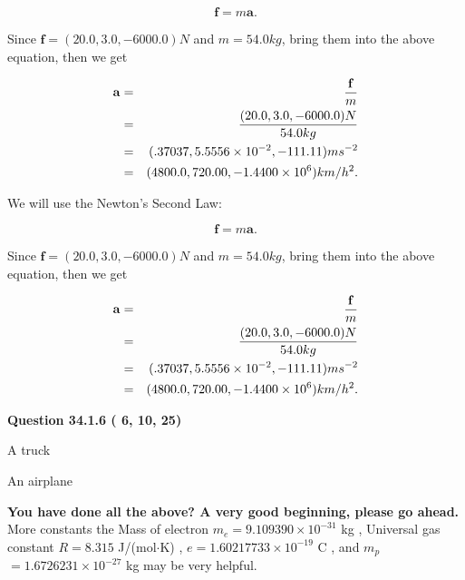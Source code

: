 \documentclass[12pt]{article}
\begin{document}
\[
\mathbf{f}=m\mathbf{a}.
\]
 
Since $\mathbf{f}=( %
20.0,  %
3.0,  %
-6000.0 )N$
and $m= %
54.0 kg$, bring them into the above equation, then we get
 
\begin{eqnarray*}
\mathbf{a}&=&\frac{\mathbf{f}}m  \\
&=&\frac{(
20.0 ,
3.0 ,
-6000.0 )N
}{ %
54.0 kg}  \\
&=&(
.37037 ,
5.5556 \times 10^{-2},
-111.11
)ms^{-2} \\
&=&(
4800.0 ,
720.00 ,
-1.4400 \times 10^{6}
)km/h^2.
\end{eqnarray*}
 
 
 
 
 
\noindent{}

We will use the Newton's Second Law:
 
\[
\mathbf{f}=m\mathbf{a}.
\]
 
Since $\mathbf{f}=( %
20.0,  %
3.0,  %
-6000.0 )N$
and $m= %
54.0 kg$, bring them into the above equation, then we get
 
\begin{eqnarray*}
\mathbf{a}&=&\frac{\mathbf{f}}m  \\
&=&\frac{(
20.0 ,
3.0 ,
-6000.0 )N
}{ %
54.0 kg}  \\
&=&(
.37037 ,
5.5556 \times 10^{-2},
-111.11
)ms^{-2} \\
&=&(
4800.0 ,
720.00 ,
-1.4400 \times 10^{6}
)km/h^2.
\end{eqnarray*}
 
 
 
  
\vspace{0.2in}
  
{\textbf{\Large{Question
34.1.6 
 (          6,         10,         25)
}}}
  
  
 
 
\noindent{}
 
 
A truck
 
 
An airplane
 
 
 
 
   
   
\vspace{0.3in}
{\textbf{\LARGE{You have done all the above? A very good beginning, please go ahead.}}}
More constants the
Mass of electron
$m_e$$ =
9.109390 \times 10^{-31} $
kg
,
Universal gas constant
$R$$ =
8.315 $
J/(mol$\cdot $K)
,
$e$$ =
1.60217733 \times 10^{-19} $
C
, and
$m_p$$ =
1.6726231 \times 10^{-27} $
kg
%
may be very helpful.
\vspace{0.3in}
   
\end{document}
